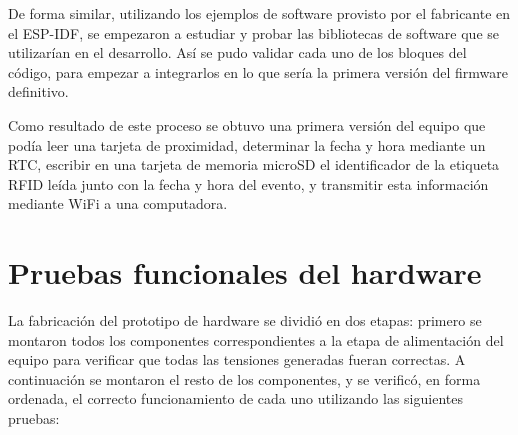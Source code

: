 De forma similar, utilizando los ejemplos de software provisto por el fabricante en el ESP-IDF\cite{noauthor_esp-idf_nodate}\cite{noauthor_espressifesp-idf_2020}, se empezaron a estudiar y probar las bibliotecas de software que se utilizarían en el desarrollo. Así se pudo validar cada uno de los bloques del código, para empezar a integrarlos en lo que sería la primera versión del firmware definitivo. 

Como resultado de este proceso se obtuvo una primera versión del equipo que podía leer una tarjeta de proximidad, determinar la fecha y hora mediante un RTC, escribir en una tarjeta de memoria microSD el identificador de la etiqueta RFID leída junto con la fecha y hora del evento, y transmitir esta información mediante WiFi a una computadora.

\section{Pruebas funcionales del hardware}
\label{sec:pruebasHW}

La fabricación del prototipo de hardware se dividió en dos etapas: primero se montaron todos los componentes correspondientes a la etapa de alimentación del equipo para verificar que todas las tensiones generadas fueran correctas. A continuación se montaron el resto de los componentes, y se verificó, en forma ordenada, el correcto funcionamiento de cada uno utilizando las siguientes pruebas:

